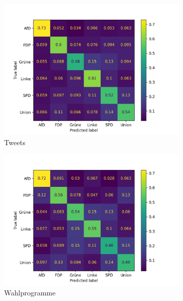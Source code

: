 \begin{figure}[H]
  \centering
  \begin{subfigure}{0.49\textwidth}
    \includegraphics[width=\textwidth]{data/images/modeling/fasttext/under/tweets_confusion_matrix.png}
    \caption{Tweets} \label{sfig:confusionMatrixFastTextTweets}
  \end{subfigure}
  \hfill
  \begin{subfigure}{0.49\textwidth}
    \includegraphics[width=\textwidth]{data/images/modeling/fasttext/under/party_programs_confusion_matrix.png}
    \caption{Wahlprogramme} \label{sfig:confusionMatrixFastTextManifest}
  \end{subfigure}
  \hfill
  \begin{subfigure}{0.49\textwidth}

\end{subfigure}
\end{figure}
